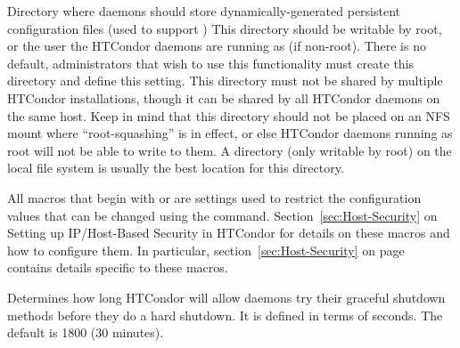 \begin{description}
\label{param:PersistentConfigDir}
\item[\Macro{PERSISTENT\_CONFIG\_DIR}]
  Directory where daemons should store dynamically-generated
  persistent configuration files (used to support
   )
  This directory should  be writable by root, or the user
  the HTCondor daemons are running as (if non-root).
  There is no default, administrators that wish to use this
  functionality must create this directory and define this setting.
  This directory must not be shared by multiple HTCondor installations,
  though it can be shared by all HTCondor daemons on the same host.
  Keep in mind that this directory should not be placed on an NFS
  mount where ``root-squashing'' is in effect, or else HTCondor daemons
  running as root will not be able to write to them.
  A directory (only writable by root) on the local file system is
  usually the best location for this directory.

\label{param:SettableAttrs}
\item[\Macro{SETTABLE\_ATTRS\_<PERMISSION-LEVEL>}]
  All macros that begin with  or
   are settings used to restrict the 
  configuration values that can be changed using the  
  command.
  Section~\ref{sec:Host-Security} on Setting up
  IP/Host-Based Security in HTCondor for details on these
  macros and how to configure them.  
  In particular, section~\ref{sec:Host-Security}
  on page~\pageref{sec:Host-Security} contains details specific to
  these macros.

\label{param:ShutdownGracefulTimeout}
\item[\Macro{SHUTDOWN\_GRACEFUL\_TIMEOUT}]
  Determines how long
  HTCondor will allow daemons try their graceful shutdown methods
  before they do a hard shutdown.  It is defined in terms of seconds.
  The default is 1800 (30 minutes).


\end{description}
